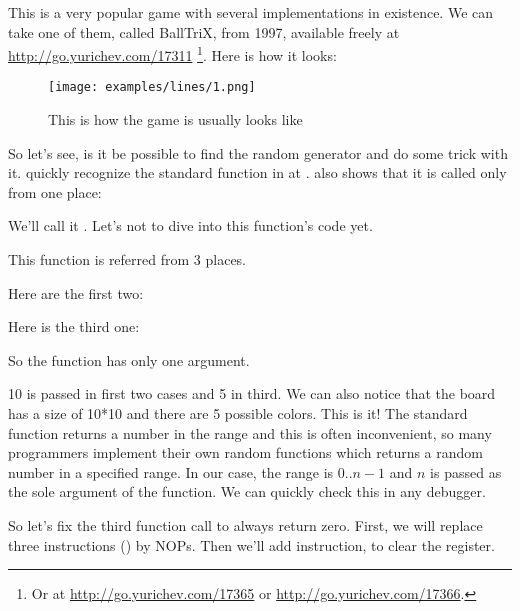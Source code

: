﻿\clearpage
{}
\label{chap:color_lines}

This is a very popular game with several implementations in existence.
We can take one of them, called BallTriX, from 1997, available freely at \url{http://go.yurichev.com/17311}
\footnote{Or at \url{http://go.yurichev.com/17365} or \url{http://go.yurichev.com/17366}.}.
Here is how it looks:%

\begin{figure}[H]
\centering
\texttt{[image: examples/lines/1.png]}
\caption{This is how the game is usually looks like}
\label{fig:lines_1}
\end{figure}

\clearpage
{}

So let's see, is it be possible to find the random generator and do some trick with it.
\IDA quickly recognize the standard  function in  at .
\IDA also shows that it is called only from one place:



We'll call it .
Let's not to dive into this function's code yet.

This function is referred from 3 places.

Here are the first two:



Here is the third one:



So the function has only one argument.

10 is passed in first two cases and 5 in third.
We can also notice 
that the board has a size of 10*10 and there are 5 possible colors.
This is it!
The standard  function returns 
a number in the  range and this is often inconvenient,
so many programmers implement their own random functions which returns a random number in a specified range.
In our case, the range is $0..n-1$ and $n$ is passed as the sole argument of the function.
We can quickly check this in any debugger.

So let's fix the third function call to always return zero.
First, we will replace three instructions () 
by \ac{NOP}s.
Then we'll add  instruction, 
to clear the \EAX register.

